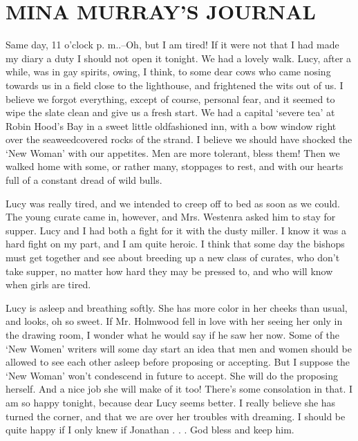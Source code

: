 \chapter{MINA MURRAY'S JOURNAL}

Same day, 11 o'clock p. m..--Oh, but I am tired! If it were not that I had made my diary a duty I should not open it tonight. We had a lovely walk. Lucy, after a while, was in gay spirits, owing, I think, to some dear cows who came nosing towards us in a field close to the lighthouse, and frightened the wits out of us. I believe we forgot everything, except of course, personal fear, and it seemed to wipe the slate clean and give us a fresh start. We had a capital `severe tea' at Robin Hood's Bay in a sweet little oldfashioned inn, with a bow window right over the seaweedcovered rocks of the strand. I believe we should have shocked the `New Woman' with our appetites. Men are more tolerant, bless them! Then we walked home with some, or rather many, stoppages to rest, and with our hearts full of a constant dread of wild bulls. 

Lucy was really tired, and we intended to creep off to bed as soon as we could. The young curate came in, however, and Mrs. Westenra asked him to stay for supper. Lucy and I had both a fight for it with the dusty miller. I know it was a hard fight on my part, and I am quite heroic. I think that some day the bishops must get together and see about breeding up a new class of curates, who don't take supper, no matter how hard they may be pressed to, and who will know when girls are tired. 

Lucy is asleep and breathing softly. She has more color in her cheeks than usual, and looks, oh so sweet. If Mr. Holmwood fell in love with her seeing her only in the drawing room, I wonder what he would say if he saw her now. Some of the `New Women' writers will some day start an idea that men and women should be allowed to see each other asleep before proposing or accepting. But I suppose the `New Woman' won't condescend in future to accept. She will do the proposing herself. And a nice job she will make of it too! There's some consolation in that. I am so happy tonight, because dear Lucy seems better. I really believe she has turned the corner, and that we are over her troubles with dreaming. I should be quite happy if I only knew if Jonathan . . . God bless and keep him. 

